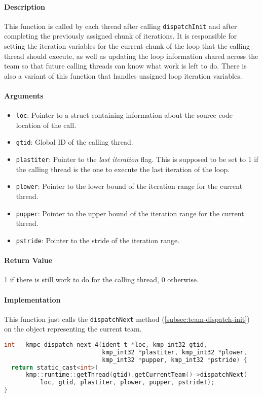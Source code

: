 \paragraph{Description} This function is called by each thread after calling \texttt{dispatchInit}
and after completing the previously assigned chunk of iterations. It is responsible for setting the
iteration variables for the current chunk of the loop that the calling thread should execute, as
well as updating the loop information shared across the team so that future calling threads can know
what work is left to do. There is also a variant of this function that handles unsigned loop
iteration variables.

\paragraph{Arguments}
\begin{itemize}
	\item \texttt{loc}: Pointer to a struct containing information about the source code location
	      of the call.
	\item \texttt{gtid}: Global ID of the calling thread.
	\item \texttt{plastiter}: Pointer to the \emph{last iteration} flag. This is supposed to be set
	      to 1 if the calling thread is the one to execute the last iteration of the loop.
	\item \texttt{plower}: Pointer to the lower bound of the iteration range for the current thread.
	\item \texttt{pupper}: Pointer to the upper bound of the iteration range for the current thread.
	\item \texttt{pstride}: Pointer to the stride of the iteration range.
\end{itemize}

\paragraph{Return Value} 1 if there is still work to do for the calling thread, 0 otherwise.

\paragraph{Implementation} This function just calls the \texttt{dispatchNext} method
(\cref{subsec:team-dispatch-init}) on the object representing the current team.

\begin{lstlisting}[language=C, caption={__kmpc_dispatch_next_4},
                   label={lst:kmpc-dispatch-next-4}, escapechar=@]
int __kmpc_dispatch_next_4(ident_t *loc, kmp_int32 gtid,
                           kmp_int32 *plastiter, kmp_int32 *plower,
                           kmp_int32 *pupper, kmp_int32 *pstride) {
  return static_cast<int>(
      kmp::runtime::getThread(gtid).getCurrentTeam()->dispatchNext(
          loc, gtid, plastiter, plower, pupper, pstride));
}
\end{lstlisting}

